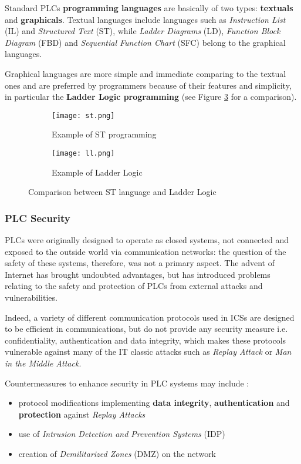 Standard PLCs \textbf{programming languages} are basically of two types: \textbf{textuals} and \textbf{graphicals}.
Textual languages include languages such as \textit{Instruction List} (IL) and \textit{Structured Text} (ST), while \textit{Ladder Diagrams} (LD), \textit{Function Block Diagram} (FBD) and \textit{Sequential Function Chart} (SFC) belong to the graphical languages.

\bigskip
Graphical languages are more simple and immediate comparing to the textual ones and are preferred by programmers because of their features and simplicity, in particular the \textbf{Ladder Logic programming} (see Figure \ref{fig:st_ll_comparison} for a comparison).

\begin{figure}[ht]
	\centering
	\begin{subfigure}{0.47\textwidth}
		\texttt{[image: st.png]}
		\caption{Example of ST programming}
		\label{subfig:st_example}
	\end{subfigure}
	\hfill
	\begin{subfigure}{0.47\textwidth}
		\texttt{[image: ll.png]}
		\caption{Example of Ladder Logic}
		\label{subfig:ladder_logic_example}
	\end{subfigure}
	\caption{Comparison between ST language and Ladder Logic}
	\label{fig:st_ll_comparison}
	
\end{figure}

\subsubsection{PLC Security}
\label{subsubsec:plc_security}
PLCs were originally designed to operate as closed systems, not connected and exposed to the outside world via communication networks: the question of the safety of these systems, therefore, was not a primary aspect. The advent of  Internet has brought undoubted advantages, but has introduced problems relating to the safety and protection of PLCs from external attacks and vulnerabilities.

Indeed, a variety of different communication protocols used in ICSs are designed to be efficient in communications, but do not provide any security measure i.e. confidentiality, authentication and data integrity, which makes these protocols vulnerable against many of the IT classic attacks such as \textit{Replay Attack} or \textit{Man in the Middle Attack}. 

\bigskip
Countermeasures to enhance security in PLC systems may include \cite{plc_security}:
\begin{itemize}
	\item protocol modifications implementing \textbf{data integrity}, \textbf{authentication} and \textbf{protection} against \textit{Replay Attacks}
	\item use of \textit{Intrusion Detection and Prevention Systems} (IDP) 
	\item creation of \textit{Demilitarized Zones} (DMZ) on the network
\end{itemize}


